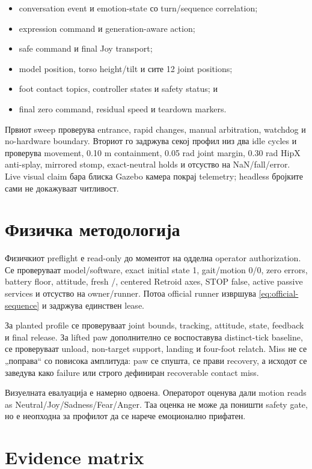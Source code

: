 \begin{itemize}
  \item conversation event и emotion-state со turn/sequence correlation;
  \item expression command и generation-aware action;
  \item safe command и final Joy transport;
  \item model position, torso height/tilt и сите 12 joint positions;
  \item foot contact topics, controller states и safety status; и
  \item final zero command, residual speed и teardown markers.
\end{itemize}

Првиот sweep проверува entrance, rapid changes, manual arbitration, watchdog и
no-hardware boundary. Вториот го задржува секој профил низ два idle cycles и
проверува movement, 0.10 m containment, 0.05 rad joint margin, 0.30 rad HipX
anti-splay, mirrored stomp, exact-neutral holds и отсуство на NaN/fall/error.
Live visual claim бара блиска Gazebo камера покрај telemetry; headless бројките
сами не докажуваат читливост.

\section{Физичка методологија}

Физичкиот preflight е read-only до моментот на одделна operator authorization.
Се проверуваат model/software, exact initial state 1, gait/motion 0/0, zero
errors, battery floor, attitude, fresh /, centered
Retroid axes, STOP false, active passive services и отсуство на owner/runner.
Потоа official runner извршува \cref{eq:official-sequence} и задржува единствен
lease.

За planted profile се проверуваат joint bounds, tracking, attitude, state,
feedback и final release. За lifted paw дополнително се воспоставува
distinct-tick baseline, се проверуваат unload, non-target support, landing и
four-foot relatch. Miss не се „поправа“ со повисока амплитуда: paw се спушта,
се прави recovery, а исходот се заведува како failure или строго дефиниран
recoverable contact miss.

Визуелната евалуација е намерно одвоена. Операторот оценува дали motion reads as
Neutral/Joy/Sadness/Fear/Anger. Таа оценка не може да поништи safety gate, но е
неопходна за профилот да се нарече емоционално прифатен.

\section{Evidence matrix}

